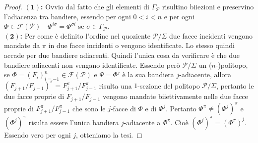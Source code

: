 \documentclass[a4paper,12pt]{report}
\newcommand{\p}{\mathcal{P}}
\theoremstyle{plain}
\theoremstyle{definition}
\newcommand\point[1]{$\bm{(#1)}$\textbf{: }}
\newcommand\flag[1]{\mathcal{F}(#1)}
\begin{document}
\begin{proof}
\point{1}Ovvio dal fatto che gli elementi di $\Gamma_\p$ risultino biiezioni e preservino l'adiacenza tra bandiere, essendo per ogni
$0<i<n$ e per ogni $\Phi\in\flag{\p}\quad\Phi^{i\sigma}=\Phi^{\sigma i}$ se $\sigma\in\Gamma_\p$.\\
\point{2}Per come \`e definito l'ordine nel quoziente $\p/\Sigma$ due facce incidenti vengono mandate da $\pi$ in due facce incidenti
o vengono identificate. Lo stesso quindi accade per due bandiere adiacenti. Quindi l'unica cosa da verificare \`e che due bandiere adiacenti non
vengano identificate. Essendo per\`o $\p/\Sigma$ un ($n$-)politopo, se $\Phi=(F_i)_{i=-1}^n\in\flag{\p}$ e $\Psi=\Phi^j$ \`e la sua bandiera
$j$-adiacente, allora $(F_{j+1}/F_{j-1})^\pi=F_{j+1}^\pi/F_{j-1}^\pi$ risulta una $1$-sezione del politopo $\p/\Sigma$, pertanto le due facce 
proprie di $F_{j+1}/F_{j-1}$ vengono mandate biiettivamente nelle due facce proprie di $F_{j+1}^\pi/F_{j-1}^\pi$ che sono le $j$-facce di
$\Phi$ e di $\Phi^j$. Pertanto $\Phi^\pi\neq(\Phi^j)^\pi$ e $(\Phi^j)^\pi$ risulta essere l'unica bandiera $j$-adiacente a $\Phi^\pi$. Cio\`e
$(\Phi^j)^\pi=(\Phi^\pi)^j$. Essendo vero per ogni $j$, otteniamo la tesi.
\end{proof}
\end{document}
